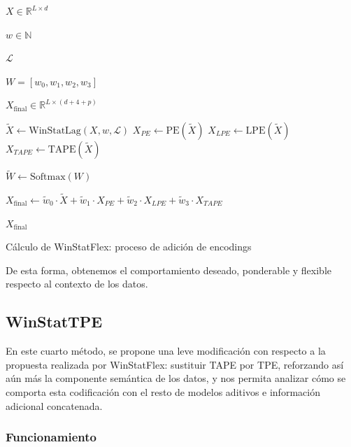 \begin{algorithm}[H]
	\begin{algorithmic}[1]
		\Require
		$X \in \mathbb{R}^{L \times d}$ 
		
		$w \in \mathbb{N}$ 
		
		$\mathcal{L}$ 
		
		$W = [w_0, w_1, w_2, w_3]$ 
		
		\Ensure
		$X_{\text{final}} \in \mathbb{R}^{L \times (d + 4 + p)}$ 
		
		\State $\tilde{X} \gets \text{WinStatLag}(X, w, \mathcal{L})$ 
		\State $X_{PE} \gets \text{PE}(\tilde{X})$ 
		\State $X_{LPE} \gets \text{LPE}(\tilde{X})$ 
		\State $X_{TAPE} \gets \text{TAPE}(\tilde{X})$ 
		
		\State $\tilde{W} \gets \mathrm{Softmax}(W)$ 
		
		\State $X_{\text{final}} \gets \tilde{w}_0 \cdot \tilde{X} + \tilde{w}_1 \cdot X_{PE} + \tilde{w}_2 \cdot X_{LPE} + \tilde{w}_3 \cdot X_{TAPE}$
		
		\State \Return $X_{\text{final}}$
	\end{algorithmic}
	\caption{Cálculo de WinStatFlex: proceso de adición de encodings}
	\label{winstatflex}
\end{algorithm}


De esta forma, obtenemos el comportamiento deseado, ponderable y flexible respecto al contexto de los datos.

\subsection{WinStatTPE}

En este cuarto método, se propone una leve modificación con respecto a la propuesta realizada por WinStatFlex: sustituir TAPE por TPE, reforzando así aún más la componente semántica de los datos, y nos permita analizar cómo se comporta esta codificación con el resto de modelos aditivos e información adicional concatenada.

\subsubsection{Funcionamiento}

